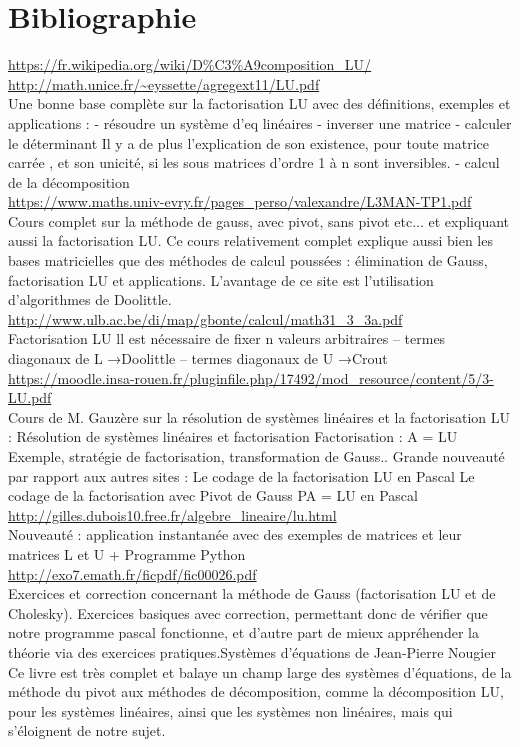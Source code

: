 \documentclass[a4paper,12pt]{report}
\title{}
\date{}
\begin{document}
	\chapter*{Bibliographie}
\url{https://fr.wikipedia.org/wiki/D%C3%A9composition_LU/}\\
\url{http://math.unice.fr/~eyssette/agregext11/LU.pdf}\\
Une bonne base complète sur la factorisation LU avec des définitions, exemples et
applications :
- résoudre un système d'eq linéaires
- inverser une matrice
- calculer le déterminant
Il y a de plus l'explication de son existence, pour toute matrice carrée , et son unicité, si les
sous matrices d'ordre 1 à n sont inversibles.
- calcul de la décomposition\\

\url{https://www.maths.univ-evry.fr/pages_perso/valexandre/L3MAN-TP1.pdf}\\
Cours complet sur la méthode de gauss, avec pivot, sans pivot etc... et expliquant aussi la
factorisation LU.
Ce cours relativement complet explique aussi bien les bases matricielles que des méthodes
de calcul poussées : élimination de Gauss, factorisation LU et applications.
L’avantage de ce site est l’utilisation d’algorithmes de Doolittle.\\

\url{http://www.ulb.ac.be/di/map/gbonte/calcul/math31_3_3a.pdf}\\
Factorisation LU
ll est nécessaire de fixer n valeurs arbitraires
– termes diagonaux de L →Doolittle
– termes diagonaux de U →Crout\\

\url{https://moodle.insa-rouen.fr/pluginfile.php/17492/mod_resource/content/5/3-LU.pdf}\\
Cours de M. Gauzère sur la résolution de systèmes linéaires et la factorisation LU :
Résolution de systèmes linéaires et factorisation
Factorisation : A = LU
Exemple, stratégie de factorisation, transformation de Gauss..
Grande nouveauté par rapport aux autres sites :
Le codage de la factorisation LU en Pascal
Le codage de la factorisation avec Pivot de Gauss PA = LU en Pascal\\

\url{http://gilles.dubois10.free.fr/algebre_lineaire/lu.html}\\
Nouveauté : application instantanée avec des exemples de matrices et leur matrices L et U +
Programme Python \\

\url{http://exo7.emath.fr/ficpdf/fic00026.pdf}\\
Exercices et correction concernant la méthode de Gauss (factorisation LU et de Cholesky).
Exercices basiques avec correction, permettant donc de vérifier que notre programme pascal
fonctionne, et d'autre part de mieux appréhender la théorie via des exercices pratiques.Systèmes d’équations de Jean-Pierre Nougier
Ce livre est très complet et balaye un champ large des systèmes d'équations, de la méthode
du pivot aux méthodes de décomposition, comme la décomposition LU, pour les systèmes
linéaires, ainsi que les systèmes non linéaires, mais qui s'éloignent de notre sujet.\\
\end{document}

